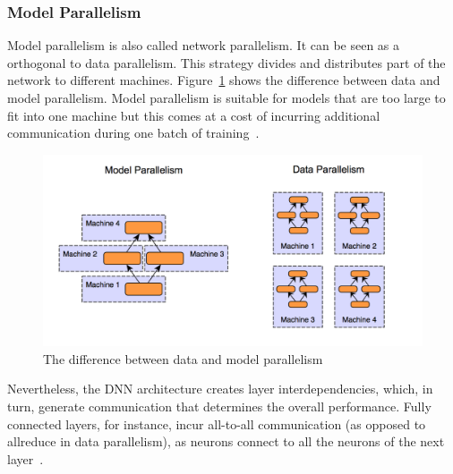 \subsubsection{Model Parallelism}
Model parallelism is also called network parallelism. It can be seen as a 
orthogonal to data parallelism. This strategy divides and distributes part of 
the network to different machines. Figure~\ref{fig:model} shows the difference 
between data and model parallelism. Model parallelism is suitable for models 
that are too large to fit into one machine but this comes at a cost of incurring 
additional communication during one batch of training~\cite{model0}.
\begin{figure}[H]
    \centerline{\includegraphics[scale=0.60]{background/figs/model_parallelism.png}}
    \caption{The difference between data and model parallelism}
    \label{fig:model}
\end{figure}

Nevertheless, the DNN architecture creates layer interdependencies, which, in 
turn, generate communication that determines the overall performance. Fully
connected layers, for instance, incur all-to-all communication (as opposed to 
allreduce in data parallelism), as neurons connect to all the neurons of the 
next layer~\cite{model1}.


